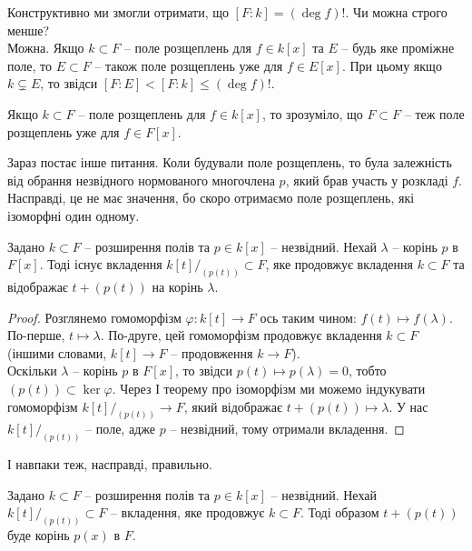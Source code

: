 \documentclass{math_library}
\begin{document}
\begin{remark}
Конструктивно ми змогли отримати, що $[F:k] = (\deg f)!$. Чи можна строго менше?\\
Можна. Якщо $k \subset F$ -- поле розщеплень для $f \in k[x]$ та $E$ -- будь яке проміжне поле, то $E \subset F$ -- також поле розщеплень уже для $f \in E[x]$. При цьому якщо $k \subsetneq E$, то звідси $[F:E] < [F:k] \leq (\deg f)!$.
\end{remark}

\begin{remark}
Якщо $k \subset F$ -- поле розщеплень для $f \in k[x]$, то зрозуміло, що $F \subset F$ -- теж поле розщеплень уже для $f \in F[x]$.
\end{remark}

Зараз постає інше питання. Коли будували поле розщеплень, то була залежність від обрання незвідного нормованого многочлена $p$, який брав участь у розкладі $f$. Насправді, це не має значення, бо скоро отримаємо поле розщеплень, які ізоморфні один одному.

\begin{proposition}
\label{map_from_roots_to_some_embedding}
Задано $k \subset F$ -- розширення полів та $p \in k[x]$ -- незвідний. Нехай $\lambda$ -- корінь $p$ в $F[x]$. Тоді існує вкладення $k[t]/_{(p(t))} \subset F$, яке продовжує вкладення $k \subset F$ та відображає $t + (p(t))$ на корінь $\lambda$.
\end{proposition}

\begin{proof}
Розглянемо гомоморфізм $\varphi \colon k[t] \to F$ ось таким чином: $f(t) \mapsto f(\lambda)$. По-перше, $t \mapsto \lambda$. По-друге, цей гомоморфізм продовжує вкладення $k \subset F$ (іншими словами, $k[t] \to F$ -- продовження $k \to F$).\\
Оскільки $\lambda$ -- корінь $p$ в $F[x]$, то звідси $p(t) \mapsto p(\lambda) = 0$, тобто $(p(t)) \subset \ker \varphi$. Через І теорему про ізоморфізм ми можемо індукувати гомоморфізм $k[t]/_{(p(t))} \to F$, який відображає $t+(p(t)) \mapsto \lambda$. У нас $k[t]/_{(p(t))}$ -- поле, адже $p$ -- незвідний, тому отримали вкладення.
\end{proof}

І навпаки теж, насправді, правильно.

\begin{proposition}
Задано $k \subset F$ -- розширення полів та $p \in k[x]$ -- незвідний. Нехай $k[t]/_{(p(t))} \subset F$ -- вкладення, яке продовжує $k \subset F$. Тоді образом $t + (p(t))$ буде корінь $p(x)$ в $F$.
\end{proposition}
\end{document}
